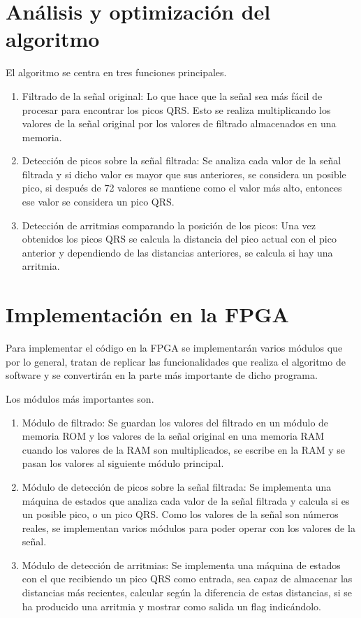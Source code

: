 \section{Análisis y optimización del algoritmo}
El algoritmo se centra en tres funciones principales.
\begin{enumerate}
	\item Filtrado de la señal original: Lo que hace que la señal sea más fácil de procesar para encontrar los picos QRS.
	 Esto se realiza multiplicando los valores de la señal original por los valores de filtrado almacenados en una memoria.
	\item Detección de picos sobre la señal filtrada: Se analiza cada valor de la señal filtrada y si dicho valor es mayor que
	 sus anteriores, se considera un posible pico, si después de 72 valores se mantiene como el valor más alto, entonces ese valor
	 se considera un pico QRS.
	\item Detección de arritmias comparando la posición de los picos: Una vez obtenidos los picos QRS se calcula la distancia
	 del pico actual con el pico anterior y dependiendo de las distancias anteriores, se calcula si hay una arritmia.
\end{enumerate}


\section{Implementación en la FPGA}
Para implementar el código en la FPGA se implementarán varios módulos que por lo general, tratan de replicar las funcionalidades que realiza
el algoritmo de software y se convertirán en la parte más importante de dicho programa.  

Los módulos más importantes son.

	\begin{enumerate}
		\item Módulo de filtrado: Se guardan los valores del filtrado en un módulo de memoria ROM y los valores de la señal original en una memoria RAM 
		cuando los valores de la RAM son multiplicados, se escribe en la RAM y se pasan los valores al siguiente módulo principal.
		\item Módulo de detección de picos sobre la señal filtrada: Se implementa una máquina de estados que analiza cada valor de
		 la señal filtrada y calcula si es un posible pico, o un pico QRS. Como los valores de la señal son números reales, se implementan varios módulos para
		 poder operar con los valores de la señal. 
		\item Módulo de detección de arritmias: Se implementa una máquina de estados con el que recibiendo un pico QRS como entrada, sea capaz de almacenar las
		 distancias más recientes, calcular según la diferencia de estas distancias, si se ha producido una arritmia y mostrar como salida un flag indicándolo.
	\end{enumerate}
	
